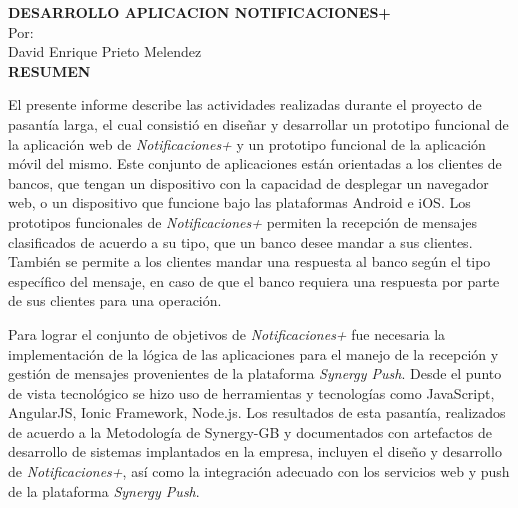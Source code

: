 \setcounter{page}{4}
\begin{center}

{\bfseries DESARROLLO APLICACION NOTIFICACIONES+\\}
\bigskip
Por: \\ David Enrique Prieto Melendez\\
\bigskip
\bigskip
{\bf RESUMEN}  %
\end{center}	

El presente informe describe las actividades realizadas durante el proyecto de pasantía larga, el cual consistió en diseñar y desarrollar un prototipo funcional de la aplicación web de \textit{Notificaciones+} y un prototipo funcional de la aplicación móvil del mismo. Este conjunto de aplicaciones están orientadas a los clientes de bancos, que tengan un dispositivo con la capacidad de desplegar un navegador web, o un dispositivo que funcione bajo las plataformas Android e iOS. Los prototipos funcionales de \textit{Notificaciones+} permiten la recepción de mensajes clasificados de acuerdo a su tipo, que un banco desee mandar a sus clientes. También se permite a los clientes mandar una respuesta al banco según el tipo específico del mensaje, en caso de que el banco requiera una respuesta por parte de sus clientes para una operación.


Para lograr el conjunto de objetivos de \textit{Notificaciones+} fue necesaria la implementación de la lógica de las aplicaciones para el manejo de la recepción y gestión de mensajes provenientes de la plataforma \textit{Synergy Push}. Desde el punto de vista tecnológico se hizo uso de herramientas y tecnologías como JavaScript, AngularJS, Ionic Framework, Node.js. Los resultados de esta pasantía, realizados de acuerdo a la Metodología de Synergy-GB y documentados con artefactos de desarrollo de sistemas implantados en la empresa, incluyen el diseño y desarrollo de \textit{Notificaciones+}, así como la integración adecuado con los servicios web y push de la plataforma \textit{Synergy Push}.
